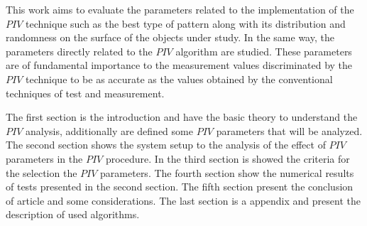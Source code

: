 This work aims to evaluate the parameters related to the implementation of the $PIV$ 
technique such as the best type of pattern along with its distribution and randomness on the 
surface of the objects under study. In the same way, the parameters directly related to the $PIV$ 
algorithm are studied. These parameters 
are of fundamental importance to the measurement values discriminated by the $PIV$ technique 
to be as accurate as the values obtained by the conventional techniques of test and measurement.

The first section is the introduction and have the basic theory to understand the
$PIV$ analysis, additionally are defined some $PIV$  parameters that will be analyzed.
The second section shows the system setup to the analysis
of the effect of $PIV$ parameters in the $PIV$ procedure.
In the third section is showed the criteria for the selection the $PIV$
parameters. 
The fourth section show the numerical results of tests presented 
in the second section.
The fifth section  present the conclusion of article and some considerations.
The last section is a appendix and present the description of used algorithms.